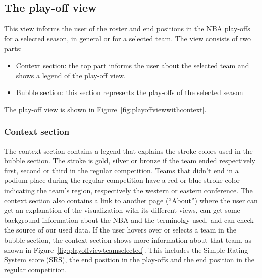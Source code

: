 \documentclass{sigchi}
\begin{document}
\subsection{The play-off view}
This view informs the user of the roster and end positions in the NBA play-offs for a selected season, in general or for a selected team. The view consists of two parts: 
\begin{itemize}
    \item Context section: the top part informs the user about the selected team and shows a legend of the play-off view.
    \item Bubble section: this section represents the play-offs of the selected season
\end{itemize}
The play-off view is shown in Figure~\ref{fig:playoffviewwithcontext}.

\subsubsection{Context section}
The context section contains a legend that explains the stroke colors used in
the bubble section. The stroke is gold, silver or bronze if the team ended
respectively first, second or third in the regular competition. Teams that
didn't end in a podium place during the regular competition have a red or blue
stroke color indicating the team's region, respectively the western or eastern
conference. The context section also contains a link to another page
(``About'') where the user can get an explanation of the visualization with its
different views, can get some background information about the NBA and the
terminolgy used, and can check the source of our used data. If the user hovers
over or selects a team in the bubble section, the context section shows more
information about that team, as shown in
Figure~\ref{fig:playoffviewteamselected}. This includes the Simple Rating
System score (SRS), the end position in the play-offs and the end position in
the regular competition.
\end{document}
